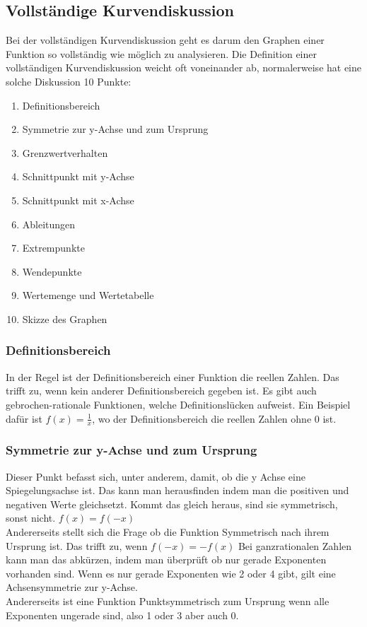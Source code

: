 \documentclass{article}
\begin{document}
	\subsection{Vollständige Kurvendiskussion}
	Bei der vollständigen Kurvendiskussion geht es darum den Graphen einer Funktion so vollständig wie möglich zu analysieren. Die Definition einer vollständigen Kurvendiskussion weicht oft voneinander ab, normalerweise hat eine solche Diskussion 10 Punkte:
	\begin{enumerate}
		\item{Definitionsbereich}
		\item{Symmetrie zur y-Achse und zum Ursprung}
		\item{Grenzwertverhalten}
		\item{Schnittpunkt mit y-Achse}
		\item{Schnittpunkt mit x-Achse}
		\item{Ableitungen}
		\item{Extrempunkte}
		\item{Wendepunkte}
		\item{Wertemenge und Wertetabelle}
		\item{Skizze des Graphen}
	\end{enumerate}
	\subsubsection{Definitionsbereich}
	In der Regel ist der Definitionsbereich einer Funktion die reellen Zahlen. Das trifft zu, wenn kein anderer Definitionsbereich gegeben ist. Es gibt auch gebrochen-rationale Funktionen, welche Definitionslücken aufweist. Ein Beispiel dafür ist $f(x)=\frac{1}{x}$, wo der Definitionsbereich die reellen Zahlen ohne 0 ist. \\
	\subsubsection{Symmetrie zur y-Achse und zum Ursprung}
	Dieser Punkt befasst sich, unter anderem, damit, ob die y Achse eine Spiegelungsachse ist. Das kann man herausfinden indem man die positiven und negativen Werte gleichsetzt. Kommt das gleich heraus, sind sie symmetrisch, sonst nicht. $f(x)=f(-x)$\\
	Andererseits stellt sich die Frage ob die Funktion Symmetrisch nach ihrem Ursprung ist. Das trifft zu, wenn $f(-x)=-f(x)$
	Bei ganzrationalen Zahlen kann man das abkürzen, indem man überprüft ob nur gerade Exponenten vorhanden sind. Wenn es nur gerade Exponenten wie 2 oder 4 gibt, gilt eine Achsensymmetrie zur y-Achse. \\
	Andererseits ist eine Funktion Punktsymmetrisch zum Ursprung wenn alle Exponenten ungerade sind, also 1 oder 3 aber auch 0.
\end{document}
